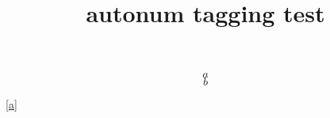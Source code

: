 \documentclass{article}
\title{autonum tagging test}
\begin{document}
\begin{equation}\label{a}
a
\end{equation}
\begin{equation}\label{b}
b
\end{equation}

\ref{a}
\end{document}
